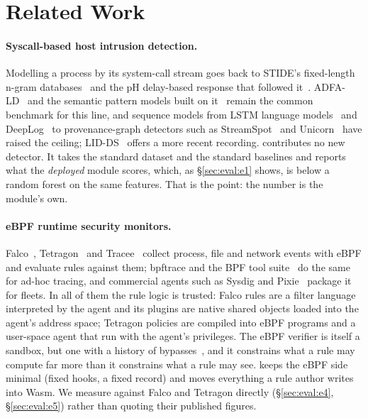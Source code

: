 \section{Related Work}
\label{sec:related}

\paragraph{Syscall-based host intrusion detection.}
Modelling a process by its system-call stream goes back to STIDE's fixed-length
n-gram databases~\cite{stide} and the pH delay-based response that followed
it~\cite{ph}. ADFA-LD~\cite{adfa-ld} and the semantic pattern models built on
it~\cite{creech} remain the common benchmark for this line, and sequence
models from LSTM language models~\cite{kim-lstm} and DeepLog~\cite{deeplog}
to provenance-graph detectors such as StreamSpot~\cite{streamspot} and
Unicorn~\cite{unicorn} have raised the ceiling; LID-DS~\cite{lidds} offers a
more recent recording. \sys contributes no new detector. It takes the standard
dataset and the standard baselines and reports what the \emph{deployed}
module scores, which, as \S\ref{sec:eval:e1} shows, is below a random forest
on the same features. That is the point: the number is the module's own.

\paragraph{eBPF runtime security monitors.}
Falco~\cite{falco}, Tetragon~\cite{tetragon} and Tracee~\cite{tracee} collect
process, file and network events with eBPF and evaluate rules against them;
bpftrace and the BPF tool suite~\cite{bpftrace,ebpf-intro} do the same for
ad-hoc tracing, and commercial agents such as Sysdig and
Pixie~\cite{sysdig,pixie} package it for fleets. In all of them the rule logic
is trusted: Falco rules are a filter language interpreted by the agent and
its plugins are native shared objects loaded into the agent's address space;
Tetragon policies are compiled into eBPF programs and a user-space agent that
run with the agent's privileges. The eBPF verifier is itself a sandbox, but
one with a history of bypasses~\cite{ebpf-bugs}, and it constrains what a rule
may compute far more than it constrains what a rule may see. \sys keeps the
eBPF side minimal (fixed hooks, a fixed record) and moves everything a rule
author writes into Wasm. We measure against Falco and Tetragon directly
(\S\ref{sec:eval:e4}, \S\ref{sec:eval:e5}) rather than quoting their published
figures.


